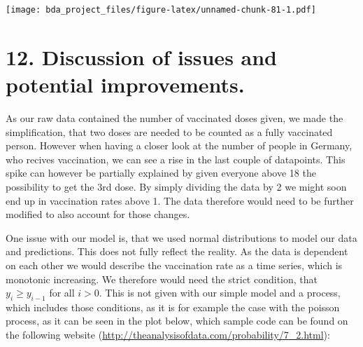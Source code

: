 \documentclass[
]{article}
\newenvironment{Shaded}{\begin{snugshade}}{\end{snugshade}}
\newcommand{\AttributeTok}[1]{\textcolor[rgb]{0.77,0.63,0.00}{#1}}
\newcommand{\DecValTok}[1]{\textcolor[rgb]{0.00,0.00,0.81}{#1}}
\newcommand{\FloatTok}[1]{\textcolor[rgb]{0.00,0.00,0.81}{#1}}
\newcommand{\FunctionTok}[1]{\textcolor[rgb]{0.00,0.00,0.00}{#1}}
\newcommand{\NormalTok}[1]{#1}
\newcommand{\OtherTok}[1]{\textcolor[rgb]{0.56,0.35,0.01}{#1}}
\newcommand{\SpecialCharTok}[1]{\textcolor[rgb]{0.00,0.00,0.00}{#1}}
\newcommand{\StringTok}[1]{\textcolor[rgb]{0.31,0.60,0.02}{#1}}
\begin{document}
\begin{Shaded}
\end{Shaded}

\texttt{[image: bda\_project\_files/figure-latex/unnamed-chunk-81-1.pdf]}

\newpage

\hypertarget{discussion-of-issues-and-potential-improvements.}{%
\section{12. Discussion of issues and potential
improvements.}\label{discussion-of-issues-and-potential-improvements.}}

As our raw data contained the number of vaccinated doses given, we made
the simplification, that two doses are needed to be counted as a fully
vaccinated person. However when having a closer look at the number of
people in Germany, who recives vaccination, we can see a rise in the
last couple of datapoints. This spike can however be partially explained
by given everyone above 18 the possibility to get the 3rd dose. By
simply dividing the data by 2 we might soon end up in vaccination rates
above 1. The data therefore would need to be further modified to also
account for those changes.

One issue with our model is, that we used normal distributions to model
our data and predictions. This does not fully reflect the reality. As
the data is dependent on each other we would describe the vaccination
rate as a time series, which is monotonic increasing. We therefore would
need the strict condition, that \(y_i \geq y_{i-1}\) for all \(i > 0\).
This is not given with our simple model and a process, which includes
those conditions, as it is for example the case with the poisson
process, as it can be seen in the plot below, which sample code can be
found on the following website
(\url{http://theanalysisofdata.com/probability/7_2.html}):
\end{document}
